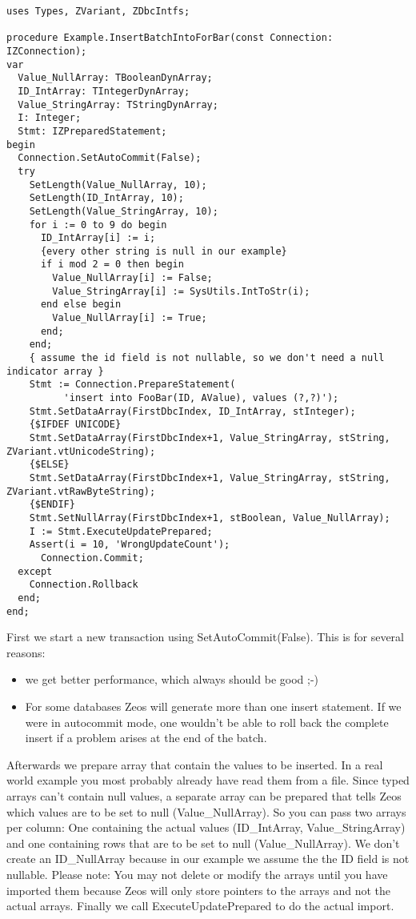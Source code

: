 \documentclass[a4paper,12pt,oneside]{book}
\begin{document}
\begin{lstlisting}
uses Types, ZVariant, ZDbcIntfs;

procedure Example.InsertBatchIntoForBar(const Connection: IZConnection);
var
  Value_NullArray: TBooleanDynArray;
  ID_IntArray: TIntegerDynArray;
  Value_StringArray: TStringDynArray;
  I: Integer;
  Stmt: IZPreparedStatement;
begin
  Connection.SetAutoCommit(False);
  try
    SetLength(Value_NullArray, 10);
    SetLength(ID_IntArray, 10);
    SetLength(Value_StringArray, 10);
    for i := 0 to 9 do begin
      ID_IntArray[i] := i;
      {every other string is null in our example}
      if i mod 2 = 0 then begin
        Value_NullArray[i] := False;
        Value_StringArray[i] := SysUtils.IntToStr(i);
      end else begin
        Value_NullArray[i] := True;
      end;
    end;
    { assume the id field is not nullable, so we don't need a null indicator array }
    Stmt := Connection.PrepareStatement(
		  'insert into FooBar(ID, AValue), values (?,?)');
    Stmt.SetDataArray(FirstDbcIndex, ID_IntArray, stInteger);
    {$IFDEF UNICODE}
    Stmt.SetDataArray(FirstDbcIndex+1, Value_StringArray, stString, ZVariant.vtUnicodeString);
    {$ELSE}
    Stmt.SetDataArray(FirstDbcIndex+1, Value_StringArray, stString, ZVariant.vtRawByteString);
    {$ENDIF}
    Stmt.SetNullArray(FirstDbcIndex+1, stBoolean, Value_NullArray);
    I := Stmt.ExecuteUpdatePrepared;
    Assert(i = 10, 'WrongUpdateCount');
	  Connection.Commit;
  except
    Connection.Rollback
  end;
end;
\end{lstlisting}

First we start a new transaction using SetAutoCommit(False).
This is for several reasons:
\begin{itemize}
\item we get better performance, which always should be good ;-)
\item
  For some databases Zeos will generate more than one insert statement.
  If we were in autocommit mode, one wouldn't be able to roll back the complete insert if a problem arises at the end of the batch.
\end{itemize}
Afterwards we prepare array that contain the values to be inserted.
In a real world example you most probably already have read them from a file.
Since typed arrays can't contain null values, a separate array can be prepared that tells Zeos which values are to be set to null (Value\_NullArray).
So you can pass two arrays per column: 
One containing the actual values (ID\_IntArray, Value\_StringArray) and one containing rows that are to be set to null (Value\_NullArray).
We don't create an ID\_NullArray because in our example we assume the the ID field is not nullable.
Please note:
You may not delete or modify the arrays until you have imported them because Zeos will only store pointers to the arrays and not the actual arrays.
Finally we call ExecuteUpdatePrepared to do the actual import.
\end{document}
